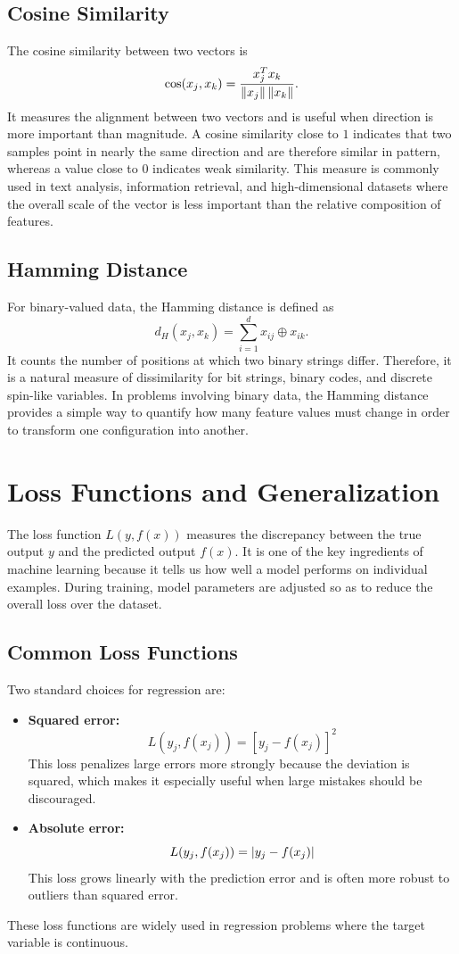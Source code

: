\documentclass[english,12pt,a4paper]{report}
\begin{document}
\subsection{Cosine Similarity}
The cosine similarity between two vectors is
\[
\cos(x_j,x_k)=\frac{x_j^Tx_k}{\norm{x_j}\,\norm{x_k}}.
\]
It measures the alignment between two vectors and is useful when direction is more important than magnitude. A cosine similarity close to $1$ indicates that two samples point in nearly the same direction and are therefore similar in pattern, whereas a value close to $0$ indicates weak similarity. This measure is commonly used in text analysis, information retrieval, and high-dimensional datasets where the overall scale of the vector is less important than the relative composition of features.

\subsection{Hamming Distance}
For binary-valued data, the Hamming distance is defined as
\[
d_H(x_j,x_k)=\sum_{i=1}^{d}x_{ij}\oplus x_{ik}.
\]
It counts the number of positions at which two binary strings differ. Therefore, it is a natural measure of dissimilarity for bit strings, binary codes, and discrete spin-like variables. In problems involving binary data, the Hamming distance provides a simple way to quantify how many feature values must change in order to transform one configuration into another.

\section{Loss Functions and Generalization}
The loss function $L(y,f(x))$ measures the discrepancy between the true output $y$ and the predicted output $f(x)$. It is one of the key ingredients of machine learning because it tells us how well a model performs on individual examples. During training, model parameters are adjusted so as to reduce the overall loss over the dataset.

\subsection{Common Loss Functions}
Two standard choices for regression are:
\begin{itemize}
	\item \textbf{Squared error:} \[L(y_j,f(x_j))=[y_j-f(x_j)]^2\]
	This loss penalizes large errors more strongly because the deviation is squared, which makes it especially useful when large mistakes should be discouraged.
	\item \textbf{Absolute error:} \[L(y_j,f(x_j))=\abs{y_j-f(x_j)}\]
	This loss grows linearly with the prediction error and is often more robust to outliers than squared error.
\end{itemize}
These loss functions are widely used in regression problems where the target variable is continuous.
\end{document}
